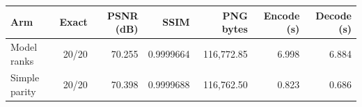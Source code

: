 \begin{tabularx}{\textwidth}{@{}lrrrrrr@{}}
\toprule
Arm & Exact & PSNR (dB) & SSIM & PNG bytes & Encode (s) & Decode (s)\\
\midrule
Model ranks & 20/20 & 70.255 & 0.9999664 & 116,772.85 & 6.998 & 6.884\\
Simple parity & 20/20 & 70.398 & 0.9999688 & 116,762.50 & 0.823 & 0.686\\
\bottomrule
\end{tabularx}
